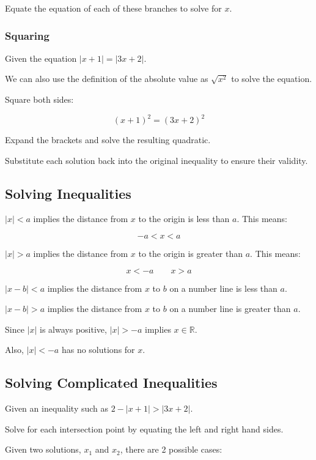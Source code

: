 \documentclass[a4paper,11pt]{report}
\begin{document}
Equate the equation of each of these branches to solve for $x$.

\subsubsection{Squaring}

Given the equation $\lvert x + 1 \rvert = \lvert 3x + 2 \rvert$.

We can also use the definition of the absolute value as $\sqrt{x^2}$ to solve
the equation.

Square both sides:

$$
(x + 1)^2 = (3x + 2)^2
$$

Expand the brackets and solve the resulting quadratic.

Substitute each solution back into the original inequality to ensure their
validity.

\subsection{Solving Inequalities}

$\lvert x \rvert < a$ implies the distance from $x$ to the origin is less than
$a$. This means:

$$
-a < x < a
$$

$\lvert x \rvert > a$ implies the distance from $x$ to the origin is greater
than $a$. This means:

$$
x < -a \qquad x > a
$$

$\lvert x - b \rvert < a$ implies the distance from $x$ to $b$ on a number line
is less than $a$.

$\lvert x - b \rvert > a$ implies the distance from $x$ to $b$ on a number line
is greater than $a$.

Since $\lvert x \rvert$ is always positive, $\lvert x \rvert > -a$ implies
$x \in \mathbb{R}$.

Also, $\lvert x \rvert < -a$ has no solutions for $x$.

\subsection{Solving Complicated Inequalities}

Given an inequality such as $2 - \lvert x + 1 \rvert > \lvert 3x + 2 \rvert$.

Solve for each intersection point by equating the left and right hand sides.

Given two solutions, $x_1$ and $x_2$, there are 2 possible cases:
\end{document}
